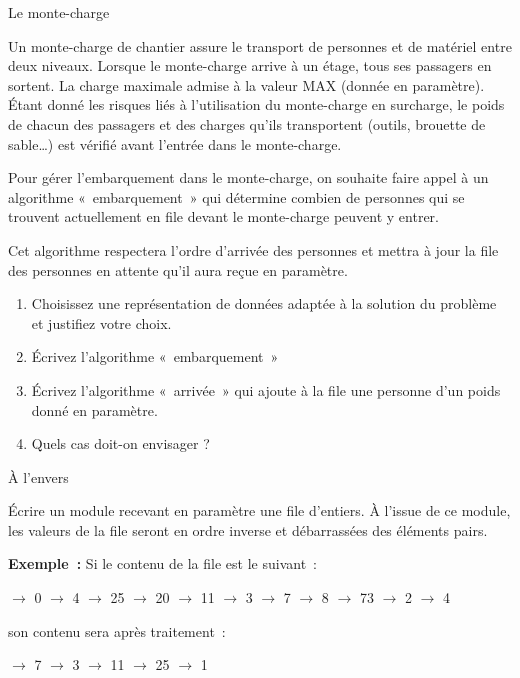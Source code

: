 	\begin{Exercice}{Le monte-charge}
		
		Un monte-charge de chantier assure le transport de personnes 
		et de matériel entre deux niveaux. Lorsque le monte-charge
		arrive à un étage, tous ses passagers en sortent. La charge
		maximale admise à la valeur MAX (donnée en paramètre).
		Étant donné les risques liés à l'utilisation du monte-charge 
		en surcharge, le poids de chacun des passagers et des
		charges qu'ils transportent (outils, brouette de sable{\dots}) 
		est vérifié avant l'entrée dans le monte-charge.

		Pour gérer l'embarquement dans le monte-charge, on souhaite 
		faire appel à un algorithme «~embarquement~» qui détermine
		combien de personnes qui se trouvent actuellement 
		en file devant le monte-charge peuvent y entrer.

		Cet algorithme respectera l'ordre d'arrivée des personnes 
		et mettra à jour la file des personnes en attente qu'il aura
		reçue en paramètre.

		\begin{enumerate}
			\item {
				Choisissez une représentation de données adaptée à la solution du problème et justifiez votre choix. }
			\item {
				Écrivez l'algorithme «~embarquement~»}
			\item {
				Écrivez l'algorithme «~arrivée~» qui ajoute à la file une personne d'un poids donné en paramètre.}
			\item {
				Quels cas doit-on envisager ?}
		\end{enumerate}

	\end{Exercice}

	\begin{Exercice}{À l'envers}
	
		Écrire un module recevant en paramètre une file d'entiers. 
		À l'issue de ce module, les valeurs de la file seront en
		ordre inverse et débarrassées des éléments pairs.

		\textbf{Exemple~:} Si le contenu de la file est le suivant~:

		{ $\rightarrow $ 0 $\rightarrow $ 4 
		$\rightarrow $ 25 $\rightarrow $ 20 
		$\rightarrow $ 11 $\rightarrow $ 3 $\rightarrow
		$ 7 $\rightarrow $ 8 $\rightarrow $ 73 
		$\rightarrow $ 2 $\rightarrow $ 4
		\par}

		son contenu sera après traitement~: 

		{ $\rightarrow $ 7 $\rightarrow $ 3 $\rightarrow 
		$ 11 $\rightarrow $ 25 $\rightarrow $ 1
		\par}

\end{Exercice}
	
		